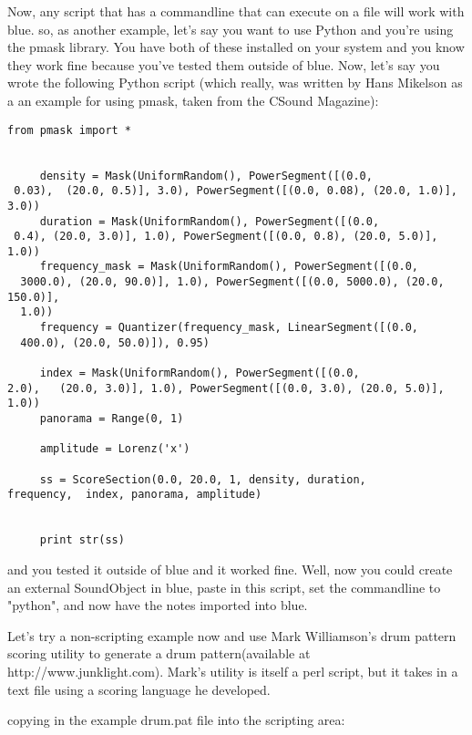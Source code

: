 Now, any script that has a commandline that can execute on a file will
work with blue. so, as another example, let's say you want to use Python
and you're using the pmask library. You have both of these installed on
your system and you know they work fine because you've tested them
outside of blue. Now, let's say you wrote the following Python script
(which really, was written by Hans Mikelson as a an example for using
pmask, taken from the CSound Magazine):

\begin{verbatim}
from pmask import *

    
     density = Mask(UniformRandom(), PowerSegment([(0.0,
 0.03),  (20.0, 0.5)], 3.0), PowerSegment([(0.0, 0.08), (20.0, 1.0)], 3.0))
     duration = Mask(UniformRandom(), PowerSegment([(0.0, 
 0.4), (20.0, 3.0)], 1.0), PowerSegment([(0.0, 0.8), (20.0, 5.0)], 1.0))
     frequency_mask = Mask(UniformRandom(), PowerSegment([(0.0,
  3000.0), (20.0, 90.0)], 1.0), PowerSegment([(0.0, 5000.0), (20.0, 150.0)],
  1.0))
     frequency = Quantizer(frequency_mask, LinearSegment([(0.0,
  400.0), (20.0, 50.0)]), 0.95)

     index = Mask(UniformRandom(), PowerSegment([(0.0,
2.0),   (20.0, 3.0)], 1.0), PowerSegment([(0.0, 3.0), (20.0, 5.0)], 1.0))
     panorama = Range(0, 1)
    
     amplitude = Lorenz('x')
    
     ss = ScoreSection(0.0, 20.0, 1, density, duration, 
frequency,  index, panorama, amplitude)

    
     print str(ss)
\end{verbatim}

and you tested it outside of blue and it worked fine. Well, now you
could create an external SoundObject in blue, paste in this script, set
the commandline to "python", and now have the notes imported into blue.

Let's try a non-scripting example now and use Mark Williamson's drum
pattern scoring utility to generate a drum pattern(available at
http://www.junklight.com). Mark's utility is itself a perl script, but
it takes in a text file using a scoring language he developed.

copying in the example drum.pat file into the scripting area:

